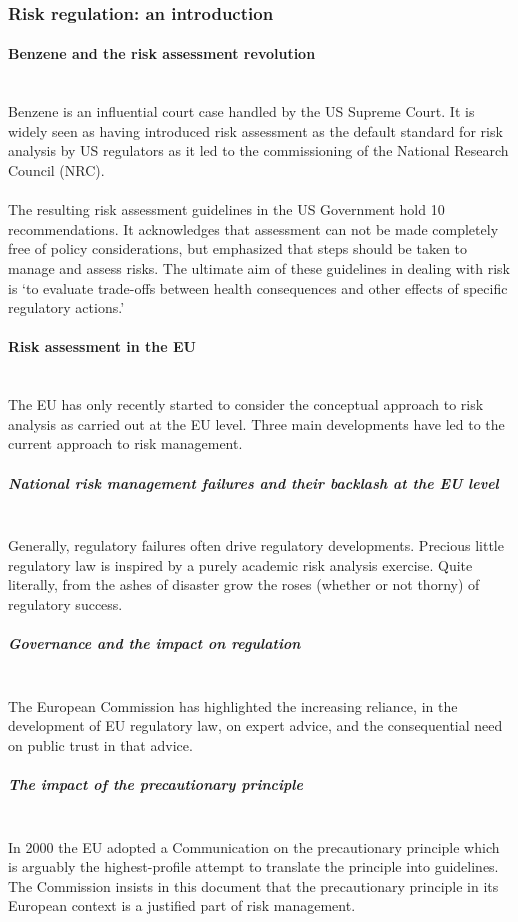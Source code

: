 \documentclass[../summary.tex]{subfiles}
\begin{document}
		\subsubsection{Risk regulation: an introduction}
			\paragraph{Benzene and the risk assessment revolution}\mbox{}\\
				Benzene is an influential court case handled by the US Supreme Court. It is widely seen as having introduced risk assessment as the default standard for risk analysis by US regulators as it led to the commissioning of the National Research Council (NRC). \\
				\\
				The resulting risk assessment guidelines in the US Government hold 10 recommendations. It acknowledges that assessment can not be made completely free of policy considerations, but emphasized that steps should be taken to  manage and assess risks. The ultimate aim of these guidelines in dealing with risk is `to evaluate trade-offs between health consequences and other effects of specific regulatory actions.' 
				
			\paragraph{Risk assessment in the EU}\mbox{}\\
				The EU has only recently started to consider the conceptual approach to risk analysis as carried out at the EU level. Three main developments have led to the current approach to risk management. 
				
				\subparagraph{National risk management failures and their backlash at the EU level}\mbox{}\\
					Generally, regulatory failures often drive regulatory developments. Precious little regulatory law is inspired by a purely academic risk analysis exercise. Quite literally, from the ashes of disaster grow the roses (whether or not thorny) of regulatory success.
				
				\subparagraph{Governance and the impact on regulation}\mbox{}\\
					The European Commission has highlighted the increasing reliance, in the development of EU regulatory law, on expert advice, and the consequential need on public trust in that advice.
					
				\subparagraph{The impact of the precautionary principle}\mbox{}\\
					In 2000 the EU adopted a Communication on the precautionary principle which is arguably the highest-profile attempt to translate the principle into guidelines. The Commission insists in this document that the precautionary principle in its European context is a justified part of risk management.
					
\end{document}
